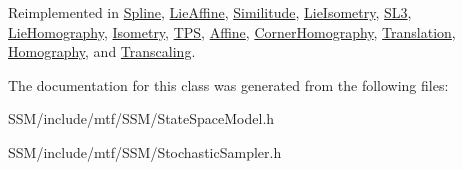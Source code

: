 Reimplemented in \hyperlink{classSpline_a8db3ad0a056e94f2adc7503677fd1675}{Spline}, \hyperlink{classLieAffine_a25b82bb4020629dfaa792b71e6b74567}{Lie\-Affine}, \hyperlink{classSimilitude_a96e413d6abded447be0230c3ad7718bd}{Similitude}, \hyperlink{classLieIsometry_a3959b6cf83ac76224c58902f8a4c41aa}{Lie\-Isometry}, \hyperlink{classSL3_a5942f2e2cdd33447fa6eedd5a9104dc9}{S\-L3}, \hyperlink{classLieHomography_af27ac56fd834a994901949548db721ff}{Lie\-Homography}, \hyperlink{classIsometry_aec3c4d4f20d5c34ee3ab79747e6e1532}{Isometry}, \hyperlink{classTPS_ac3ae041e2b26fdcb1df4f98b27f12152}{T\-P\-S}, \hyperlink{classAffine_a64387caa4e95c06167fc2d6afa453110}{Affine}, \hyperlink{classCornerHomography_a09026e49b30f58affc5b0324747c8d1e}{Corner\-Homography}, \hyperlink{classTranslation_a636f8ce8dd8d4d72c2f110a2aeef7fc9}{Translation}, \hyperlink{classHomography_a2d9bf9a73b33fe6ea5537d1ab790aa0b}{Homography}, and \hyperlink{classTranscaling_ab349cd5b1915285f96ec447046540a44}{Transcaling}.



The documentation for this class was generated from the following files\-:\begin{DoxyCompactItemize}
\item 
S\-S\-M/include/mtf/\-S\-S\-M/State\-Space\-Model.\-h\item 
S\-S\-M/include/mtf/\-S\-S\-M/Stochastic\-Sampler.\-h\end{DoxyCompactItemize}
